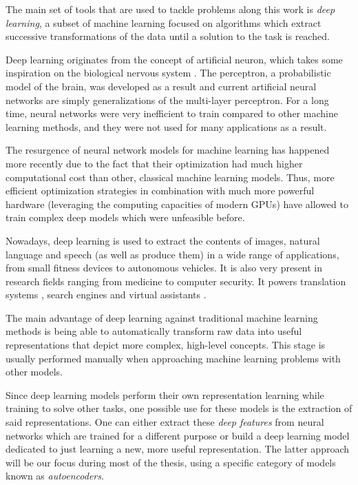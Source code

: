 The main set of tools that are used to tackle problems along this work is \textit{deep learning}, a subset of machine learning focused on algorithms which extract successive transformations of the data until a solution to the task is reached.

Deep learning originates from the concept of artificial neuron, which takes some inspiration on the biological nervous system . The perceptron, a probabilistic model of the brain, was developed as a result  and current artificial neural networks are simply generalizations of the multi-layer perceptron. For a long time, neural networks were very inefficient to train compared to other machine learning methods, and they were not used for many applications as a result.

The resurgence of neural network models for machine learning has happened more recently due to the fact that their optimization had much higher computational cost than other, classical machine learning models. Thus, more efficient optimization strategies in combination with much more powerful hardware (leveraging the computing capacities of modern GPUs) have allowed to train complex deep models which were unfeasible before.

Nowadays, deep learning is used to extract the contents of images, natural language and speech (as well as produce them) in a wide range of applications, from small fitness devices to autonomous vehicles. It is also very present in research fields ranging from medicine to computer security. It powers translation systems , search engines  and virtual assistants . 

The main advantage of deep learning against traditional machine learning methods is being able to automatically transform raw data into useful representations that depict more complex, high-level concepts. This stage is usually performed manually when approaching machine learning problems with other models.

Since deep learning models perform their own representation learning while training to solve other tasks, one possible use for these models is the extraction of said representations. One can either extract these \textit{deep features} from neural networks which are trained for a different purpose or build a deep learning model dedicated to just learning a new, more useful representation. The latter approach will be our focus during most of the thesis, using a specific category of models known as \textit{autoencoders}.

